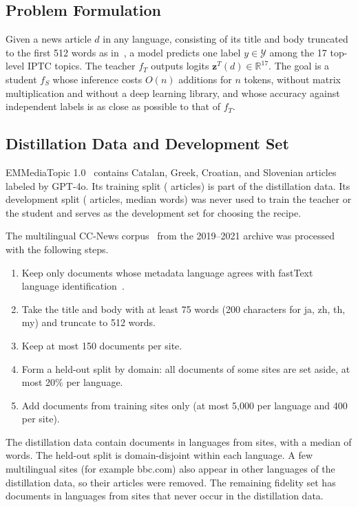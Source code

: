 \subsection{Problem Formulation}
Given a news article $d$ in any language, consisting of its title and body truncated to the first 512 words as in~\cite{kuzman2025llm}, a model predicts one label $y\in\mathcal{Y}$ among the 17 top-level IPTC topics. The teacher $f_T$ outputs logits $\mathbf{z}^T(d)\in\mathbb{R}^{17}$. The goal is a student $f_S$ whose inference costs $O(n)$ additions for $n$ tokens, without matrix multiplication and without a deep learning library, and whose accuracy against independent labels is as close as possible to that of $f_T$.

\subsection{Distillation Data and Development Set}
EMMediaTopic 1.0~\cite{emmediatopic2025,kuzman2025llm} contains Catalan, Greek, Croatian, and Slovenian articles labeled by GPT-4o. Its training split ( articles) is part of the distillation data. Its development split ( articles, median  words) was never used to train the teacher or the student and serves as the development set for choosing the recipe.

The multilingual CC-News corpus~\cite{cloversearch_ccnews} from the 2019--2021 archive was processed with the following steps.
\begin{enumerate}
  \item Keep only documents whose metadata language agrees with fastText language identification~\cite{joulin2017bag}.
  \item Take the title and body with at least 75 words (200 characters for ja, zh, th, my) and truncate to 512 words.
  \item Keep at most 150 documents per site.
  \item Form a held-out split by domain: all documents of some sites are set aside, at most 20\% per language.
  \item Add  documents from training sites only (at most 5,000 per language and 400 per site).
\end{enumerate}
The distillation data contain  documents in  languages from  sites, with a median of  words. The held-out split is domain-disjoint within each language. A few multilingual sites (for example bbc.com) also appear in other languages of the distillation data, so their articles were removed. The remaining fidelity set has  documents in  languages from  sites that never occur in the distillation data.

